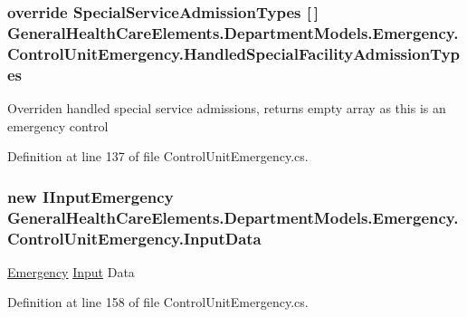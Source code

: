 \subsubsection[{\texorpdfstring{Handled\+Special\+Facility\+Admission\+Types}{HandledSpecialFacilityAdmissionTypes}}]{\setlength{\rightskip}{0pt plus 5cm}override {\bf Special\+Service\+Admission\+Types} \mbox{[}$\,$\mbox{]} General\+Health\+Care\+Elements.\+Department\+Models.\+Emergency.\+Control\+Unit\+Emergency.\+Handled\+Special\+Facility\+Admission\+Types\hspace{0.3cm}{\ttfamily [get]}}\hypertarget{class_general_health_care_elements_1_1_department_models_1_1_emergency_1_1_control_unit_emergency_aefedc4d8884639d5f533d908d7cb2e3b}{}\label{class_general_health_care_elements_1_1_department_models_1_1_emergency_1_1_control_unit_emergency_aefedc4d8884639d5f533d908d7cb2e3b}


Overriden handled special service admissions, returns empty array as this is an emergency control 



Definition at line 137 of file Control\+Unit\+Emergency.\+cs.

\subsubsection[{\texorpdfstring{Input\+Data}{InputData}}]{\setlength{\rightskip}{0pt plus 5cm}new {\bf I\+Input\+Emergency} General\+Health\+Care\+Elements.\+Department\+Models.\+Emergency.\+Control\+Unit\+Emergency.\+Input\+Data\hspace{0.3cm}{\ttfamily [get]}}\hypertarget{class_general_health_care_elements_1_1_department_models_1_1_emergency_1_1_control_unit_emergency_ada4d7ab68e424c11f5df153161514d4b}{}\label{class_general_health_care_elements_1_1_department_models_1_1_emergency_1_1_control_unit_emergency_ada4d7ab68e424c11f5df153161514d4b}


\hyperlink{namespace_general_health_care_elements_1_1_department_models_1_1_emergency}{Emergency} \hyperlink{namespace_general_health_care_elements_1_1_input}{Input} Data 



Definition at line 158 of file Control\+Unit\+Emergency.\+cs.

